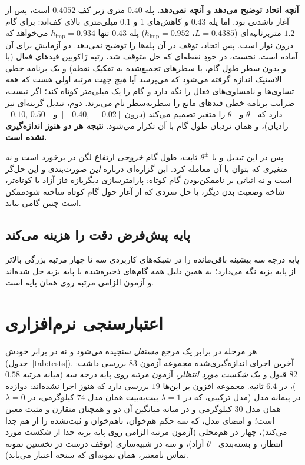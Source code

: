 \documentclass[10pt,twocolumn]{article}
\newcommand{\en}[1]{\lr{#1}}
\newcommand{\md}{\lr{\textemdash}}
\begin{document}
\textbf{آنچه اتحاد توضیح می‌دهد و آنچه نمی‌دهد.} پله $0.40$ متری زیر کف $0.4052$ است، پس از
آغاز ناشدنی بود. اما پله $0.43$ و کاهش‌های $1$ و $0.1$ میلی‌متری بالای کف‌اند: برای گام
$1.2$ متربرثانیه‌ای ($L=0.4385$، $h_{\mathrm{imp}}=0.952$) پله $0.43$ تنها
$h_{\mathrm{imp}}=0.934$ می‌خواهد که درون نوار است. پس اتحاد، توقف در آن پله‌ها را توضیح
نمی‌دهد. دو آزمایش برای آن آماده است. نخست، در خودِ نقطه‌ای که حل متوقف شد، رتبه ژاکوبین
قیدهای فعال (با و بدون سطر طول گام، با سطرهای تجمیع‌شده به تفکیک نقطه) و یک برنامه خطی
الاستیک اندازه گرفته می‌شود که می‌پرسد آیا \emph{هیچ} جهت مرتبه اولی هست که همه تساوی‌ها و
نامساوی‌های فعال را نگه دارد و گام را یک میلی‌متر کوتاه کند؛ اگر نیست، ضرایب برنامه خطی
قیدهای مانع را سطربه‌سطر نام می‌برند. دوم، تبدیل گزینه‌ای نیز دارد که $\theta^-$ و
$\theta^+$ را متغیر تصمیم می‌کند (درون $[-0.40,\,-0.02]$ و $[0.10,\,0.50]$ رادیان)، و همان
نردبان طول گام با آن تکرار می‌شود. \textbf{نتیجه هر دو هنوز اندازه‌گیری نشده است.}

پس در این تبدیل و با $\theta^\pm$ ثابت، طول گام \emph{خروجی} ارتفاع لگن در برخورد است و نه
متغیری که بتوان با آن معامله کرد. این گزاره‌ای درباره \emph{این} صورت‌بندی و این حل‌گر است و
نه اثباتی بر ناممکن‌بودن گام کوتاه: پارامترسازی دیگر\md{}بازه فاز آزاد یا کوتاه‌تر، شاخه
وضعیت بدن دیگر، یا حل سردی که از آغاز حول گام کوتاه ساخته شود\md{}ممکن است چنین گامی بیابد.

\subsection{پایه پیش‌فرض دقت را هزینه می‌کند}
پایه \en{B-spline} درجه سه بیشینه باقی‌مانده را در شبکه‌های کاربردی سه تا چهار مرتبه بزرگی بالاتر
از پایه بزیه نگه می‌دارد؛ به همین دلیل همه گام‌های ذخیره‌شده با پایه بزیه حل شده‌اند و آزمون
الزامی مرتبه روی همان پایه است.

\section{اعتبارسنجی نرم‌افزاری}
هر مرحله در برابر یک مرجع \emph{مستقل} سنجیده می‌شود و نه در برابر خودش
(جدول~\ref{tab:tests}). آخرین اجرای اندازه‌گیری‌شده مجموعه آزمون $83$ بررسی داشت: $82$ قبول
و یک \emph{شکست مورد انتظار}، آزمون مرتبه روی پایه \en{B-spline} درجه سه (میانه مرتبه
$0.58$)، در $6.4$ ثانیه. مجموعه افزون بر این‌ها $19$ بررسی دارد که هنوز اجرا نشده‌اند:
دوازده در پیمانه مدل (مدل ترکیبی، که در $\lambda=1$ بیت‌به‌بیت همان مدل $74$ کیلوگرمی، در
$\lambda=0$ همان مدل $30$ کیلوگرمی و در میانه میانگین آن دو و همچنان متقارن و مثبت معین است؛
و امضای مدل، که سه حکم هم‌خوان، ناهم‌خوان و ثبت‌نشده را از هم جدا می‌کند)، چهار در هم‌محلی
(آزمون مرتبه الزامی روی پایه بزیه جدا از شکست مورد انتظار، و بسته‌بندی $\theta^\pm$ آزاد)، و سه
در شبیه‌سازی (توقف درست در نخستین نمونه تماس نامعتبر، همان نمونه‌ای که سنجه اعتبار می‌یابد).
\end{document}
